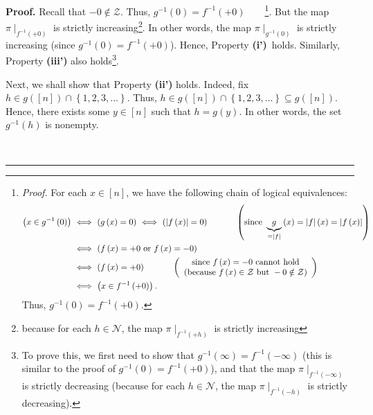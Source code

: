 \documentclass[numbers=enddot,12pt,final,onecolumn,notitlepage]{scrartcl}%
\theoremstyle{definition}
\newenvironment{proof}[1][Proof]{\noindent\textbf{#1.} }{\ \rule{0.5em}{0.5em}}
\newenvironment{verlong}{}{}
\begin{document}
\begin{verlong}
\begin{proof}
Recall that $-0\notin\mathcal{Z}$. Thus, $g^{-1}\left(  0\right)
=f^{-1}\left(  +0\right)  $\ \ \ \ \footnote{\textit{Proof.} For each
$x\in\left[  n\right]  $, we have the following chain of logical equivalences:%
\begin{align*}
\left(  x\in g^{-1}\left(  0\right)  \right)  \  &  \Longleftrightarrow
\ \left(  g\left(  x\right)  =0\right)  \ \Longleftrightarrow\ \left(
\left\vert f\left(  x\right)  \right\vert =0\right)
\ \ \ \ \ \ \ \ \ \ \left(  \text{since }\underbrace{g}_{=\left\vert
f\right\vert }\left(  x\right)  =\left\vert f\right\vert \left(  x\right)
=\left\vert f\left(  x\right)  \right\vert \right) \\
&  \Longleftrightarrow\ \left(  f\left(  x\right)  =+0\text{ or }f\left(
x\right)  =-0\right) \\
&  \Longleftrightarrow\ \left(  f\left(  x\right)  =+0\right)
\ \ \ \ \ \ \ \ \ \ \left(
\begin{array}
[c]{c}%
\text{since }f\left(  x\right)  =-0\text{ cannot hold}\\
\text{(because }f\left(  x\right)  \in\mathcal{Z}\text{ but }-0\notin%
\mathcal{Z}\text{)}%
\end{array}
\right) \\
&  \Longleftrightarrow\ \left(  x\in f^{-1}\left(  +0\right)  \right)  .
\end{align*}
Thus, $g^{-1}\left(  0\right)  =f^{-1}\left(  +0\right)  $.}. But the map
$\pi\mid_{f^{-1}\left(  +0\right)  }$ is strictly increasing\footnote{because
for each $h\in\mathcal{N}$, the map $\pi\mid_{f^{-1}\left(  +h\right)  }$ is
strictly increasing}. In other words, the map $\pi\mid_{g^{-1}\left(
0\right)  }$ is strictly increasing (since $g^{-1}\left(  0\right)
=f^{-1}\left(  +0\right)  $). Hence, Property \textbf{(i')}\ holds. Similarly,
Property \textbf{(iii')} also holds\footnote{To prove this, we first need to
show that $g^{-1}\left(  \infty\right)  =f^{-1}\left(  -\infty\right)  $ (this
is similar to the proof of $g^{-1}\left(  0\right)  =f^{-1}\left(  +0\right)
$), and that the map $\pi\mid_{f^{-1}\left(  -\infty\right)  }$ is strictly
decreasing (because for each $h\in\mathcal{N}$, the map $\pi\mid
_{f^{-1}\left(  -h\right)  }$ is strictly decreasing).}.

Next, we shall show that Property \textbf{(ii')} holds. Indeed, fix $h\in
g\left(  \left[  n\right]  \right)  \cap\left\{  1,2,3,\ldots\right\}  $.
Thus, $h\in g\left(  \left[  n\right]  \right)  \cap\left\{  1,2,3,\ldots
\right\}  \subseteq g\left(  \left[  n\right]  \right)  $. Hence, there exists
some $y\in\left[  n\right]  $ such that $h=g\left(  y\right)  $. In other
words, the set $g^{-1}\left(  h\right)  $ is nonempty.


\end{proof}
\end{verlong}
\end{document}
